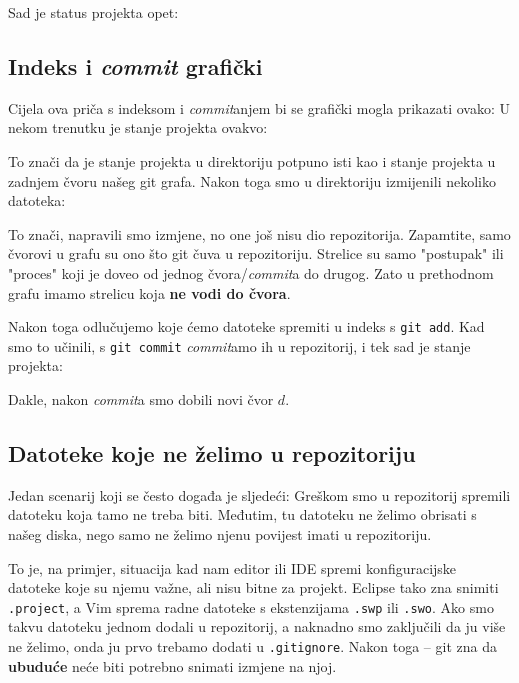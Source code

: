 Sad je status projekta opet:



\subsection*{Indeks i \emph{commit} grafički}

Cijela ova priča s indeksom i \emph{commit}anjem bi se grafički mogla prikazati ovako:
U nekom trenutku je stanje projekta ovakvo:



To znači da je stanje projekta u direktoriju potpuno isti kao i stanje projekta u zadnjem čvoru našeg git grafa.
Nakon toga smo u direktoriju izmijenili nekoliko datoteka:



To znači, napravili smo izmjene, no one još nisu dio repozitorija.
Zapamtite, samo čvorovi u grafu su ono što git čuva u repozitoriju.
Strelice su samo "postupak" ili "proces" koji je doveo od jednog čvora/\emph{commit}a do drugog.
Zato u prethodnom grafu imamo strelicu koja \textbf{ne vodi do čvora}.

Nakon toga odlučujemo koje ćemo datoteke spremiti u indeks s \verb+git add+.
Kad smo to učinili, s \verb+git commit+ \emph{commit}amo ih u repozitorij, i tek sad je stanje projekta:



Dakle, nakon \emph{commit}a smo dobili novi čvor $d$.

\subsection*{Datoteke koje ne želimo u repozitoriju}

Jedan scenarij koji se često događa je sljedeći:
Greškom smo u repozitorij spremili datoteku koja tamo ne treba biti. 
Međutim, tu datoteku ne želimo obrisati s našeg diska, nego samo ne želimo njenu povijest imati u repozitoriju.

To je, na primjer, situacija kad nam editor ili IDE spremi konfiguracijske datoteke koje su njemu važne, ali nisu bitne za projekt.
Eclipse tako zna snimiti \verb+.project+, a Vim sprema radne datoteke s ekstenzijama \verb+.swp+ ili \verb+.swo+.
Ako smo takvu datoteku jednom dodali u repozitorij, a naknadno smo zaključili da ju više ne želimo, onda ju prvo trebamo dodati u \verb+.gitignore+.
Nakon toga -- git zna da \textbf{ubuduće} neće biti potrebno snimati izmjene na njoj.

